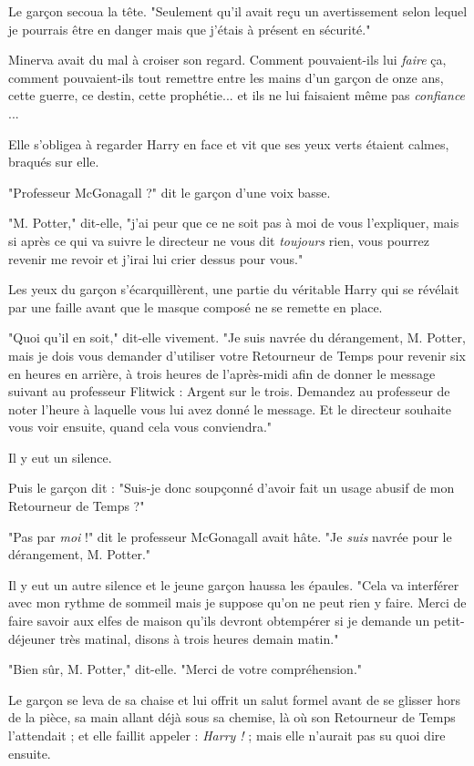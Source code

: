Le garçon secoua la tête. "Seulement qu'il avait reçu un avertissement selon lequel je pourrais être en danger mais que j'étais à présent en sécurité."

Minerva avait du mal à croiser son regard. Comment pouvaient-ils lui \emph{faire}  ça, comment pouvaient-ils tout remettre entre les mains d'un garçon de onze ans, cette guerre, ce destin, cette prophétie... et ils ne lui faisaient même pas \emph{confiance} ...

Elle s'obligea à regarder Harry en face et vit que ses yeux verts étaient calmes, braqués sur elle.

"Professeur McGonagall ?" dit le garçon d'une voix basse.

"M. Potter," dit-elle, "j'ai peur que ce ne soit pas à moi de vous l'expliquer, mais si après ce qui va suivre le directeur ne vous dit \emph{toujours}  rien, vous pourrez revenir me revoir et j'irai lui crier dessus pour vous."

Les yeux du garçon s'écarquillèrent, une partie du véritable Harry qui se révélait par une faille avant que le masque composé ne se remette en place.

"Quoi qu'il en soit," dit-elle vivement. "Je suis navrée du dérangement, M. Potter, mais je dois vous demander d'utiliser votre Retourneur de Temps pour revenir six en heures en arrière, à trois heures de l'après-midi afin de donner le message suivant au professeur Flitwick : Argent sur le trois. Demandez au professeur de noter l'heure à laquelle vous lui avez donné le message. Et le directeur souhaite vous voir ensuite, quand cela vous conviendra."

Il y eut un silence.

Puis le garçon dit : "Suis-je donc soupçonné d'avoir fait un usage abusif de mon Retourneur de Temps ?"

"Pas par \emph{moi}  !" dit le professeur McGonagall avait hâte. "Je \emph{suis}  navrée pour le dérangement, M. Potter."

Il y eut un autre silence et le jeune garçon haussa les épaules. "Cela va interférer avec mon rythme de sommeil mais je suppose qu'on ne peut rien y faire. Merci de faire savoir aux elfes de maison qu'ils devront obtempérer si je demande un petit-déjeuner très matinal, disons à trois heures demain matin."

"Bien sûr, M. Potter," dit-elle. "Merci de votre compréhension."

Le garçon se leva de sa chaise et lui offrit un salut formel avant de se glisser hors de la pièce, sa main allant déjà sous sa chemise, là où son Retourneur de Temps l'attendait ; et elle faillit appeler : \emph{Harry !}  ; mais elle n'aurait pas su quoi dire ensuite.

